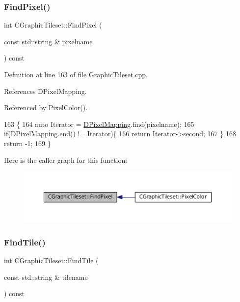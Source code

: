 \subsubsection{\texorpdfstring{Find\+Pixel()}{FindPixel()}}
{\footnotesize\ttfamily int C\+Graphic\+Tileset\+::\+Find\+Pixel (\begin{DoxyParamCaption}\item[{const std\+::string \&}]{pixelname }\end{DoxyParamCaption}) const}



Definition at line 163 of file Graphic\+Tileset.\+cpp.



References D\+Pixel\+Mapping.



Referenced by Pixel\+Color().


\begin{DoxyCode}
163                                                               \{
164     \textcolor{keyword}{auto} Iterator = \hyperlink{classCGraphicTileset_a650c021d8ea1724a4c9564600df0da05}{DPixelMapping}.find(pixelname);
165     \textcolor{keywordflow}{if}(\hyperlink{classCGraphicTileset_a650c021d8ea1724a4c9564600df0da05}{DPixelMapping}.end() != Iterator)\{
166         \textcolor{keywordflow}{return} Iterator->second;
167     \}
168     \textcolor{keywordflow}{return} -1;
169 \}
\end{DoxyCode}
Here is the caller graph for this function\+:\nopagebreak
\begin{figure}[H]
\begin{center}
\leavevmode
\includegraphics[width=350pt]{classCGraphicTileset_a87047c22039dc6137b790b7609c627a8_icgraph}
\end{center}
\end{figure}
\hypertarget{classCGraphicTileset_ab8f2c2b2f2095b17d53c3dc475d5685c}{}\label{classCGraphicTileset_ab8f2c2b2f2095b17d53c3dc475d5685c} 
\subsubsection{\texorpdfstring{Find\+Tile()}{FindTile()}}
{\footnotesize\ttfamily int C\+Graphic\+Tileset\+::\+Find\+Tile (\begin{DoxyParamCaption}\item[{const std\+::string \&}]{tilename }\end{DoxyParamCaption}) const}



